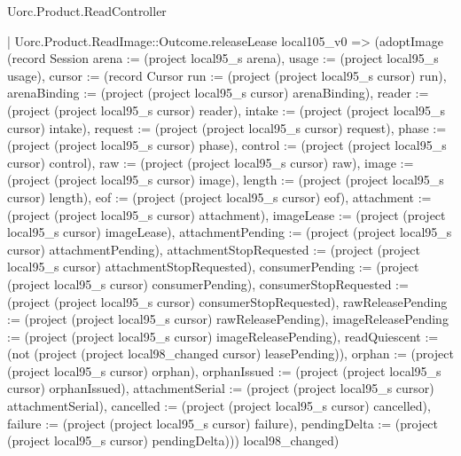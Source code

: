 \begin{lexlean}{Uorc.Product.ReadController}
\begin{semanticmodule}
{      | Uorc.Product.ReadImage::Outcome.releaseLease local105_v0 => (adoptImage (record Session {arena := (project local95_s arena), usage := (project local95_s usage), cursor := (record Cursor {run := (project (project local95_s cursor) run), arenaBinding := (project (project local95_s cursor) arenaBinding), reader := (project (project local95_s cursor) reader), intake := (project (project local95_s cursor) intake), request := (project (project local95_s cursor) request), phase := (project (project local95_s cursor) phase), control := (project (project local95_s cursor) control), raw := (project (project local95_s cursor) raw), image := (project (project local95_s cursor) image), length := (project (project local95_s cursor) length), eof := (project (project local95_s cursor) eof), attachment := (project (project local95_s cursor) attachment), imageLease := (project (project local95_s cursor) imageLease), attachmentPending := (project (project local95_s cursor) attachmentPending), attachmentStopRequested := (project (project local95_s cursor) attachmentStopRequested), consumerPending := (project (project local95_s cursor) consumerPending), consumerStopRequested := (project (project local95_s cursor) consumerStopRequested), rawReleasePending := (project (project local95_s cursor) rawReleasePending), imageReleasePending := (project (project local95_s cursor) imageReleasePending), readQuiescent := (not (project (project local98_changed cursor) leasePending)), orphan := (project (project local95_s cursor) orphan), orphanIssued := (project (project local95_s cursor) orphanIssued), attachmentSerial := (project (project local95_s cursor) attachmentSerial), cancelled := (project (project local95_s cursor) cancelled), failure := (project (project local95_s cursor) failure), pendingDelta := (project (project local95_s cursor) pendingDelta)})}) local98_changed)
}
\end{semanticmodule}
\end{lexlean}
